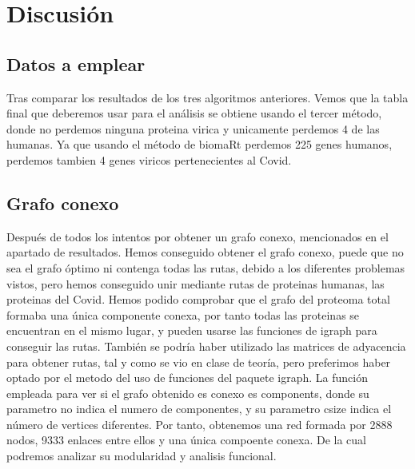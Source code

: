 \section{Discusión}
\begin{Document}

\subsection{Datos a emplear}
Tras comparar los resultados de los tres algoritmos anteriores. Vemos que la tabla final que deberemos usar para el análisis se obtiene usando el tercer método, donde no perdemos ninguna proteina virica y unicamente perdemos 4 de las humanas. Ya que usando el método de 
biomaRt perdemos 225 genes humanos, perdemos tambien 4 genes viricos pertenecientes al Covid. 

\subsection{Grafo conexo}
Después de todos los intentos por obtener un grafo conexo, mencionados en el apartado de resultados. Hemos conseguido obtener el grafo conexo, puede que no sea el grafo óptimo ni contenga todas las rutas, debido a los diferentes problemas vistos, pero hemos conseguido unir mediante rutas de proteinas humanas, las proteinas del Covid. Hemos podido comprobar que el grafo del proteoma total formaba una única componente conexa, por tanto todas las proteinas se encuentran en el mismo lugar, y pueden usarse las funciones de igraph para conseguir las rutas. También se podría haber utilizado las matrices de adyacencia para obtener rutas, tal y como se vio en clase de teoría, pero preferimos haber optado por el metodo del uso de funciones del paquete igraph. La función empleada para ver si el grafo obtenido es conexo es components, donde su parametro no indica el numero de componentes, y su parametro csize indica el número de vertices diferentes. Por tanto, obtenemos una red formada por 2888 nodos, 9333 enlaces entre ellos y una única compoente conexa. De la cual podremos analizar su modularidad y analisis funcional.
\end{Document}

